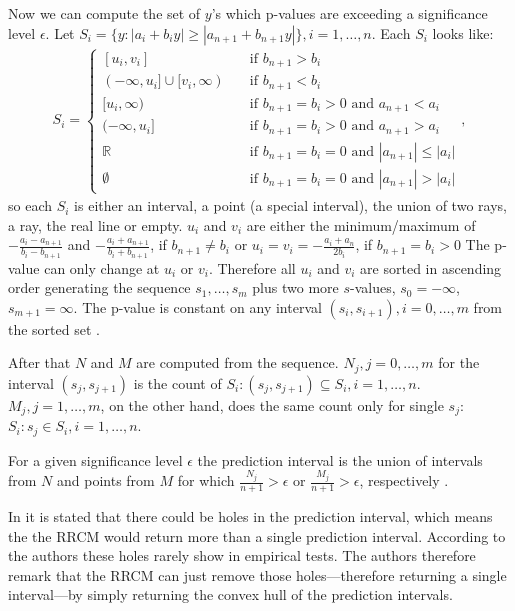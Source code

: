 \documentclass[twoside,11pt]{article}
\begin{document}
Now we can compute the set of $y$'s which p-values are
exceeding a significance level $\epsilon$.
Let $S_i = \{y: |a_i + b_i y| \geq |a_{n+1} + b_{n+1} y|\},
i=1,\dots,n$. Each $S_i$ looks like:
\begin{align*}
S_i =
  \begin{cases}
    [u_i,v_i]
      &\quad \text{if } b_{n+1} > b_i
      \\
    (-\infty, u_i] \cup [v_i, \infty)
      &\quad \text{if } b_{n+1} < b_i
      \\
    [u_i, \infty)
      &\quad \text{if } b_{n+1} = b_i > 0
      \text{ and } a_{n+1} < a_i
      \\
    (-\infty, u_i]
      &\quad \text{if } b_{n+1} = b_i > 0
      \text{ and } a_{n+1} > a_i
      \\
    \mathbb{R}
      &\quad \text{if } b_{n+1} = b_i = 0
      \text{ and } |a_{n+1}| \leq |a_i|
      \\
    \emptyset
      &\quad \text{if } b_{n+1} = b_i = 0
      \text{ and } |a_{n+1}| > |a_i|
  \end{cases},
\end{align*}
so each $S_i$ is either an interval, a point (a special
interval), the union of two rays, a ray, the real line or
empty.
$u_i$ and $v_i$ are either the minimum/maximum of
$-\frac{a_i - a_{n+1}}{b_i - b_{n+1}}$ and
$-\frac{a_i + a_{n+1}}{b_i + b_{n+1}}$,
if $b_{n+1} \neq b_{i}$ or
$u_i = v_i = -\frac{a_i + a_n}{2b_i}$, if
$b_{n+1} = b_i > 0$
The p-value can only change at $u_i$ or $v_i$.
Therefore all $u_i$ and $v_i$ are sorted in ascending
order generating the sequence $s_1,\dots,s_m$ plus two more
$s$-values, $s_0=-\infty$, $s_{m+1}=\infty$.
The p-value is constant on any interval
$(s_i,s_{i+1}),i=0,\dots,m$ from the sorted set
\citep[see][]{nouretdinov_et_al_2001}.

After that $N$ and $M$ are computed from the sequence.
$N_j, j=0,\dots,m$ for the interval $(s_j,s_{j+1})$ is the
count of $S_i: (s_j,s_{j+1}) \subseteq S_i, i=1,\dots,n$.
$M_j, j=1,\dots,m$, on the other hand, does the same count
only for single $s_j$: $S_i: s_j \in S_i, i=1,\dots,n$.

For a given significance level $\epsilon$ the prediction
interval is the union of intervals from $N$ and points from
$M$ for which $\frac{N_j}{n+1} > \epsilon$ or
$\frac{M_j}{n+1} > \epsilon$, respectively
\citep[see][Chapter 2.3]{alrw}.

In \citet{nouretdinov_et_al_2001} it is stated that there
could be holes in the prediction interval, which means the
the RRCM would return more than a single prediction
interval.
According to the authors these holes rarely show in
empirical tests.
The authors therefore remark that the RRCM can just remove
those holes---therefore returning a single interval---by
simply returning the convex hull of the prediction
intervals.
\\\\
\end{document}
